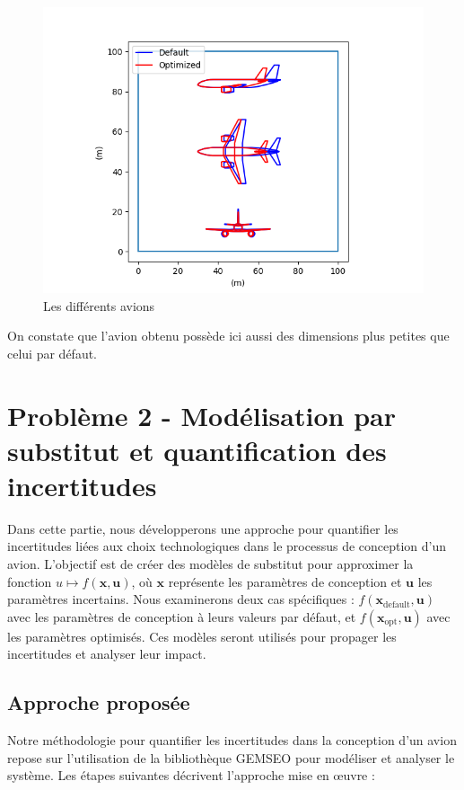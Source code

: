 \documentclass[a4paper, 11pt]{article}
\begin{document}
\begin{figure}[H]
    \centering
    \includegraphics[width=0.8\linewidth]{Images_case_2/p1u2_plots_of_the_aircrafts.png}
    \caption{Les différents avions}
    \label{fig:p1u1avions}
\end{figure}

On constate que l'avion obtenu possède ici aussi des dimensions plus petites que celui par défaut.


\section{Problème 2 - Modélisation par substitut et quantification des incertitudes}

Dans cette partie, nous développerons une approche pour quantifier les incertitudes liées aux choix technologiques dans le processus de conception d’un avion. L’objectif est de créer des modèles de substitut pour approximer la fonction \( u \mapsto f(\mathbf{x}, \mathbf{u}) \), où \( \mathbf{x} \) représente les paramètres de conception et \( \mathbf{u} \) les paramètres incertains. Nous examinerons deux cas spécifiques : \( f(\mathbf{x}_{\text{default}}, \mathbf{u}) \) avec les paramètres de conception à leurs valeurs par défaut, et \( f(\mathbf{x}_{\text{opt}}, \mathbf{u}) \) avec les paramètres optimisés. Ces modèles seront utilisés pour propager les incertitudes et analyser leur impact.

\subsection{Approche proposée}

Notre méthodologie pour quantifier les incertitudes dans la conception d’un avion repose sur l’utilisation de la bibliothèque GEMSEO pour modéliser et analyser le système. Les étapes suivantes décrivent l’approche mise en œuvre :
\end{document}
